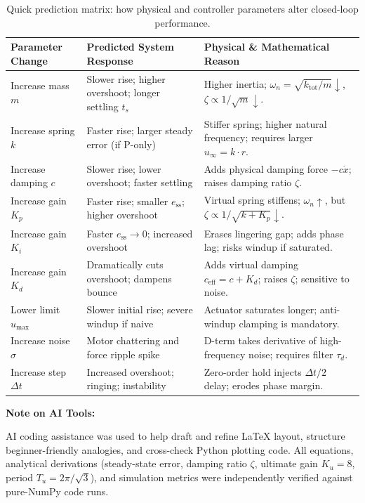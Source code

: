\documentclass[10pt,a4paper]{article}
\newenvironment{notebox}[1][Key Idea]{%
  \def\FrameCommand{\fboxsep=6pt\fcolorbox{NavyBlue!45!white}{SoftBg}}%
  \MakeFramed{\advance\hsize-\width\FrameRestore}%
  \noindent\textbf{\color{NavyBlue}#1:} \ignorespaces
}{\endMakeFramed}
\begin{document}
\begin{table}[H]
  \centering
  \small
  \begin{tabular}{p{2.8cm} p{5.2cm} p{7.8cm}}
    \toprule
    \textbf{Parameter Change} & \textbf{Predicted System Response} & \textbf{Physical \& Mathematical Reason} \\
    \midrule
    Increase mass $m$ & Slower rise; higher overshoot; longer settling $t_s$ & Higher inertia; $\omega_n = \sqrt{k_{\text{tot}}/m}\downarrow$, $\zeta \propto 1/\sqrt{m}\downarrow$. \\
    Increase spring $k$ & Faster rise; larger steady error (if P-only) & Stiffer spring; higher natural frequency; requires larger $u_{\infty} = k\cdot r$. \\
    Increase damping $c$ & Slower rise; lower overshoot; faster settling & Adds physical damping force $-c\dot{x}$; raises damping ratio $\zeta$. \\
    Increase gain $K_p$ & Faster rise; smaller $e_{\text{ss}}$; higher overshoot & Virtual spring stiffens; $\omega_n\uparrow$, but $\zeta \propto 1/\sqrt{k+K_p}\downarrow$. \\
    Increase gain $K_i$ & Faster $e_{\text{ss}}\to 0$; increased overshoot & Erases lingering gap; adds phase lag; risks windup if saturated. \\
    Increase gain $K_d$ & Dramatically cuts overshoot; dampens bounce & Adds virtual damping $c_{\text{eff}} = c + K_d$; raises $\zeta$; sensitive to noise. \\
    Lower limit $u_{\max}$ & Slower initial rise; severe windup if naive & Actuator saturates longer; anti-windup clamping is mandatory. \\
    Increase noise $\sigma$ & Motor chattering and force ripple spike & D-term takes derivative of high-frequency noise; requires filter $\tau_d$. \\
    Increase step $\Delta t$ & Increased overshoot; ringing; instability & Zero-order hold injects $\Delta t/2$ delay; erodes phase margin. \\
    \bottomrule
  \end{tabular}
  \caption{Quick prediction matrix: how physical and controller parameters alter closed-loop performance.}
  \label{tab:interview}
\end{table}

\begin{notebox}[Note on AI Tools]
AI coding assistance was used to help draft and refine LaTeX layout, structure beginner-friendly analogies, and cross-check Python plotting code. All equations, analytical derivations (steady-state error, damping ratio $\zeta$, ultimate gain $K_u = 8$, period $T_u = 2\pi/\sqrt{3}$), and simulation metrics were independently verified against pure-NumPy code runs.
\end{notebox}
\end{document}
